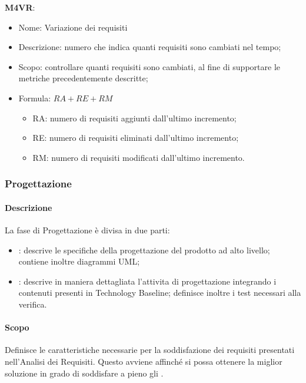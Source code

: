 \textbf{M4VR}:
\begin{itemize}
  \item Nome: Variazione dei requisiti
  \item Descrizione: numero che indica quanti requisiti sono cambiati nel tempo;
  \item Scopo: controllare quanti requisiti sono cambiati, al fine di supportare le metriche precedentemente descritte;
  \item Formula: $ RA + RE + RM $
    \begin{itemize}
      \item RA: numero di requisiti aggiunti dall'ultimo incremento;
      \item RE: numero di requisiti eliminati dall'ultimo incremento;
      \item RM: numero di requisiti modificati dall'ultimo incremento.
    \end{itemize}
\end{itemize}

\subsubsection{Progettazione} 
\paragraph{Descrizione} \hfill \break
La fase di Progettazione è divisa in due parti:
    \begin{itemize}
        \item \textbf{}: descrive le specifiche della progettazione del prodotto ad alto livello; contiene inoltre diagrammi UML;
        \item \textbf{}: descrive in maniera dettagliata l'attivita di progettazione integrando i contenuti presenti in Technology Baseline; definisce inoltre i test necessari alla verifica.
    \end{itemize} 	

\paragraph{Scopo} \hfill \break
Definisce le caratteristiche necessarie per la soddisfazione dei requisiti presentati nell'Analisi dei Requisiti.
  Questo avviene affinché si possa ottenere la miglior soluzione in grado di soddisfare a pieno gli .\\
     
